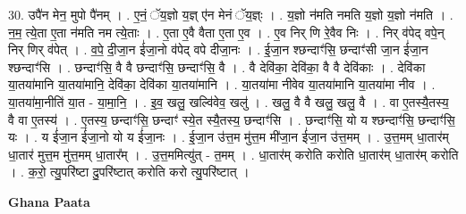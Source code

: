 \documentclass[17pt]{extarticle}
\begin{document}
30. उपै॑न मेन॒ मुपो पै॑नम् । . ए॒नं॒ ॅय॒ज्ञो य॒ज्ञ् ए॑न मेनं ॅय॒ज्ञ्ः । . य॒ज्ञो न॑मति नमति य॒ज्ञो य॒ज्ञो न॑मति । . न॒म॒ त्ये॒ता ए॒ता न॑मति नम त्ये॒ताः । . ए॒ता ए॒वै वैता ए॒ता ए॒व । . ए॒व निर् णि रे॒वैव निः । . निर् व॑पेद् वपे॒न् निर् णिर् व॑पेत् । . व॒पे॒ दी॒जा॒न ई॑जा॒नो व॑पेद् वपे दीजा॒नः । . ई॒जा॒न श्छन्दाꣳ॑सि॒ छन्दाꣳ॑सी जा॒न ई॑जा॒न श्छन्दाꣳ॑सि । . छन्दाꣳ॑सि॒ वै वै छन्दाꣳ॑सि॒ छन्दाꣳ॑सि॒ वै । . वै देवि॑का॒ देवि॑का॒ वै वै देवि॑काः । . देवि॑का या॒तया॑मानि या॒तया॑मानि॒ देवि॑का॒ देवि॑का या॒तया॑मानि । . या॒तया॑मा नीवेव या॒तया॑मानि या॒तया॑मा नीव । . या॒तया॑मा॒नीति॑ या॒त - या॒मा॒नि॒ । . इ॒व॒ खलु॒ खल्वि॑वेव॒ खलु॑ । . खलु॒ वै वै खलु॒ खलु॒ वै । . वा ए॒तस्यै॒तस्य॒ वै वा ए॒तस्य॑ । . ए॒तस्य॒ छन्दाꣳ॑सि॒ छन्दाꣳ॑ स्ये॒त स्यै॒तस्य॒ छन्दाꣳ॑सि । . छन्दाꣳ॑सि॒ यो य श्छन्दाꣳ॑सि॒ छन्दाꣳ॑सि॒ यः । . य ई॑जा॒न ई॑जा॒नो यो य ई॑जा॒नः । . ई॒जा॒न उ॑त्त॒म मु॑त्त॒म मी॑जा॒न ई॑जा॒न उ॑त्त॒मम् । . उ॒त्त॒मम् धा॒तार॑म् धा॒तार॑ मुत्त॒म मु॑त्त॒मम् धा॒तार᳚म् । . उ॒त्त॒ममित्यु॑त् - त॒मम् । . धा॒तार॑म् करोति करोति धा॒तार॑म् धा॒तार॑म् करोति । . क॒रो॒ त्यु॒परि॑ष्टा दु॒परि॑ष्टात् करोति करो त्यु॒परि॑ष्टात् । \newline

\textbf{Ghana Paata } \newline
\end{document}
